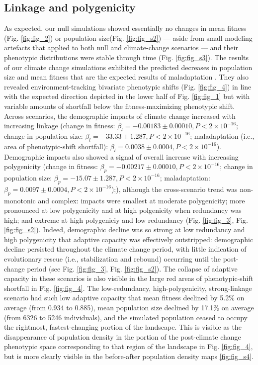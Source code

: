 \documentclass[9pt,twocolumn,twoside,lineno]{pnas-new}
\begin{document}
\subsection{Linkage and polygenicity}
As expected, our null simulations showed essentially no changes
in mean fitness (Fig. \ref{fig:fig_2}) or population size(Fig. \ref{fig:fig_s2})
--- aside from small modeling artefacts that applied to both
null and climate-change scenarios --- and their phenotypic distributions were
stable through time (Fig. \ref{fig:fig_s3}).
The results of our climate change simulations exhibited the 
predicted decreases in population size and mean fitness
that are the expected results of maladaptation \cite{aitken_whitlock}.
They also revealed environment-tracking bivariate phenotypic shifts (Fig. \ref{fig:fig_4})
in line with the expected direction depicted in the lower half of Fig. \ref{fig:fig_1}
but with variable amounts of shortfall below the fitness-maximizing phenotypic shift.
Across scenarios, the demographic impacts of
climate change increased with increasing linkage
(change in fitness: $\beta_{l} = -0.00183\pm0.00010, P<2\times10^{-16}$;
change in population size: $\beta_{l} = -33.33\pm1.287, P<2\times10^{-16}$;
maladaptation (i.e., area of phenotypic-shift shortfall): $\beta_{l} = 0.0038\pm0.0004, P<2\times10^{-16}$).
Demographic impacts also showed a signal of overall increase with increasing polygenicity
(change in fitness: $\beta_{p} = -0.00217\pm0.00010, P<2\times10^{-16}$;
change in population size: $\beta_{p} = -15.07\pm1.287, P<2\times10^{-16}$;
maladaptation: $\beta_{p} = 0.0097\pm0.0004, P<2\times10^{-16}$);),
although the cross-scenario trend was non-monotonic and complex: impacts were smallest at moderate polygenicity;
more pronounced at low polygenicity and at high polgenicity when redundancy was high;
and extreme at high polygeniciy and low redundancy (Fig. \ref{fig:fig_3}, Fig. \ref{fig:fig_s2}).
Indeed, demographic decline was so strong at low redundancy and high polygenicity
that adaptive capacity was effectively outstripped: demographic decline persisted throughout
the climate change period, with little indication of evolutionary rescue
(i.e., stabilization and rebound) occurring until the post-change period (see Fig. \ref{fig:fig_3}, Fig. \ref{fig:fig_s2}).
The collapse of adaptive capacity in these scenarios
is also visible in the large red areas of phenotypic-shift shortfall in Fig. \ref{fig:fig_4}.
The low-redundancy, high-polygenicity, strong-linkage scenario had such low adaptive capacity
that mean fitness declined by 5.2\% on average (from 0.934 to 0.885),
mean population size declined by 17.1\% on average (from 6326 to 5246 individuals),
and the simulated population ceased to occupy the rightmost, fastest-changing portion of the landscape.
This is visible as the disappearance of population density in the portion
of the post-climate change phenotypic space corresponding to that region of the landscape in Fig. \ref{fig:fig_4},
but is more clearly visible in the before-after population density maps \ref{fig:fig_s4}.
\end{document}
